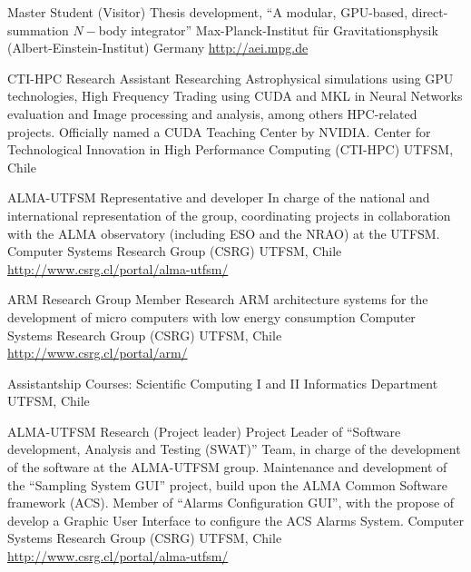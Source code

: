 \documentclass[12pt,a4paper]{moderncv}
\newcommand{\gray}{\textcolor{gray}}
\newcommand{\myurl}[1]{\gray{\url{#1}}}
\newcommand{\aei}{Max-Planck-Institut für Gravitationsphysik (Albert-Einstein-Institut)}
\begin{document}
        {Master Student (Visitor)}
        {Thesis development, %
        ``A modular, GPU-based, direct-summation $N-$body integrator'' }
        {\aei}
        {Germany}
        {\myurl{http://aei.mpg.de}}

        {CTI-HPC Research Assistant}
        {Researching %
         Astrophysical simulations using GPU technologies, %
         High Frequency Trading using CUDA and MKL in Neural Networks evaluation %
         and Image processing and analysis, among others HPC-related projects.\newline
         Officially named a CUDA Teaching Center by NVIDIA.}
        {Center for Technological Innovation in High Performance Computing (CTI-HPC)}
        {UTFSM, Chile}
        {}

        {ALMA-UTFSM Representative and developer}
        {In charge of the national and international representation of the group,
         coordinating projects in collaboration with the ALMA observatory
         (including ESO and the NRAO) at the UTFSM.}
        {Computer Systems Research Group (CSRG)}
        {UTFSM, Chile}
        {\myurl{http://www.csrg.cl/portal/alma-utfsm/}}

        {ARM Research Group Member}
        {Research ARM architecture systems for the development of micro computers
         with low energy consumption}
        {Computer Systems Research Group (CSRG)}
        {UTFSM, Chile}
        {\myurl{http://www.csrg.cl/portal/arm/}}

        {Assistantship}
        {Courses: Scientific Computing I and II}
        {Informatics Department}
        {UTFSM, Chile}
        {}

        {ALMA-UTFSM Research (Project leader)}
        {Project Leader of ``Software development, Analysis and Testing (SWAT)''
         Team, in charge of the development of the software at the ALMA-UTFSM group.
         Maintenance and development of the ``Sampling System GUI'' project,
         build upon the ALMA Common Software framework (ACS).
         Member of ``Alarms Configuration GUI'', with the propose of develop a
         Graphic User Interface to configure the ACS Alarms System.}
        {Computer Systems Research Group (CSRG)}
        {UTFSM, Chile}
        {\myurl{http://www.csrg.cl/portal/alma-utfsm/}}
\end{document}
